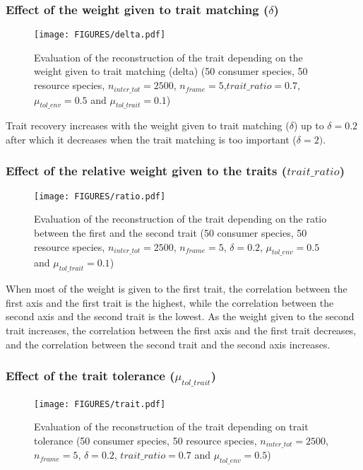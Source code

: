 \subsubsection{Effect of the weight given to trait matching ($\delta$)}

\begin{figure}[H]
    \centering
    \texttt{[image: FIGURES/delta.pdf]}
    \caption{Evaluation of the reconstruction of the trait depending on the weight given to trait matching (delta) (50 consumer species, 50 resource species, $n_{inter\_tot} = 2500$, $n_{frame} = 5$,$trait\_ratio = 0.7$, $\mu_{tol\_env} = 0.5$ and $\mu_{tol\_trait} = 0.1$)}
    \label{fig:delta}
\end{figure}

Trait recovery increases with the weight given to trait matching ($\delta$) up to $\delta = 0.2$ after which it decreases when the trait matching is too important ($\delta = 2).$



\subsubsection{Effect of the relative weight given to the traits ($trait\_ratio$)}

\begin{figure}[H]
    \centering
    \texttt{[image: FIGURES/ratio.pdf]}
    \caption{Evaluation of the reconstruction of the trait depending on the ratio between the first and the second trait (50 consumer species, 50 resource species, $n_{inter\_tot} = 2500$, $n_{frame} = 5$, $\delta =  0.2$, $\mu_{tol\_env} = 0.5$ and $\mu_{tol\_trait} = 0.1$)}
    \label{fig:trait_ratio}
\end{figure}

When most of the weight is given to the first trait, the correlation between the first axis and the first trait is the highest, while the correlation between the second axis and the second trait is the lowest. As the weight given to the second trait increases, the correlation between the first axis and the first trait decreases, and the correlation between the second trait and the second axis increases.


\subsubsection{Effect of the trait tolerance ($\mu_{tol\_trait}$)}

\begin{figure}[H]
    \centering
    \texttt{[image: FIGURES/trait.pdf]}
    \caption{Evaluation of the reconstruction of the trait depending on trait tolerance (50 consumer species, 50 resource species, $n_{inter\_tot} = 2500$, $n_{frame} = 5$, $\delta =  0.2$, $trait\_ratio = 0.7$ and $\mu_{tol\_env} = 0.5$)}
    \label{fig:tol_env}
\end{figure}

